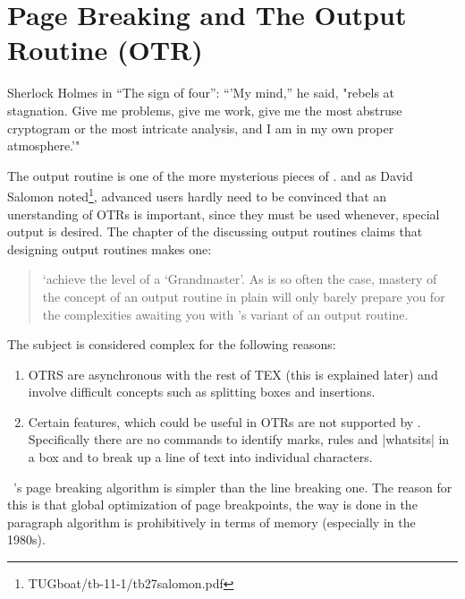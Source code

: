 
\chapter{Page Breaking and The Output Routine (OTR)}


\label{ch:OTR}

\epigraph{Sherlock Holmes in ``The sign of four'': ``'My mind,'' he said, "rebels at stagnation. Give me problems, give me work, give me the most abstruse cryptogram or the most intricate analysis, and I am in my own proper atmosphere.'" }{}


The output routine is one of the more mysterious pieces
of \tex.
and as  David Salomon noted\footnote{TUGboat/tb-11-1/tb27salomon.pdf}, advanced users hardly need to be convinced that an unerstanding of OTRs is important, since they must be used whenever, special output is desired.
 The chapter of the \texbook discussing output
routines claims that designing output routines makes one:

\begin{quotation}
`achieve the level of a `\tex Grandmaster'.
As is so often the case, mastery of the concept of an
output routine in plain \tex will only barely prepare you
for the complexities awaiting you with \latexe's variant of
an output routine.
\end{quotation}


The subject is considered complex for the following reasons:

\begin{enumerate}
\item OTRS are asynchronous with the
rest of TEX (this is explained later) and involve difficult concepts such as splitting boxes and insertions.
\item Certain features, which could be useful in OTRs are not supported by \tex. Specifically there are no commands to identify marks, rules and |whatsits| in a box and to break up a line of text into individual characters.
\end{enumerate}

\tex\ 's page breaking algorithm is simpler than the line breaking one. The reason for this is that global optimization
of page breakpoints, the way is done in the paragraph algorithm is prohibitively in terms of memory (especially in the 1980s).

